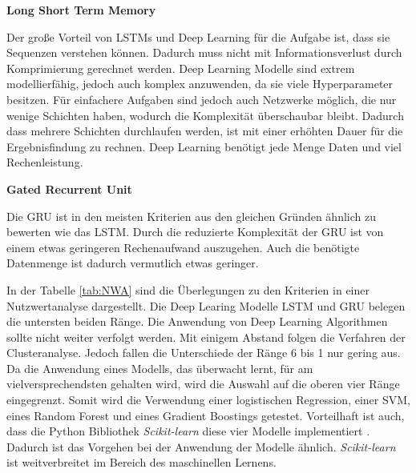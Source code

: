 \clearpage
\textbf{Long Short Term Memory}\par
Der große Vorteil von LSTMs und Deep Learning für die Aufgabe ist, dass sie Sequenzen verstehen können. Dadurch muss nicht mit Informationsverlust durch Komprimierung gerechnet werden. Deep Learning Modelle sind extrem modellierfähig, jedoch auch komplex anzuwenden, da sie viele Hyperparameter besitzen. Für einfachere Aufgaben sind jedoch auch Netzwerke möglich, die nur wenige Schichten haben, wodurch die Komplexität überschaubar bleibt. Dadurch dass mehrere Schichten durchlaufen werden, ist mit einer erhöhten Dauer für die Ergebnisfindung zu rechnen. Deep Learning benötigt jede Menge Daten und viel Rechenleistung. \dubpar

\textbf{Gated Recurrent Unit}\par
Die GRU ist in den meisten Kriterien aus den gleichen Gründen ähnlich zu bewerten wie das LSTM. Durch die reduzierte Komplexität der GRU ist von einem etwas geringeren Rechenaufwand auszugehen. Auch die benötigte Datenmenge ist dadurch vermutlich etwas geringer.\dubpar

In der Tabelle \ref{tab:NWA} sind die Überlegungen zu den Kriterien in einer Nutzwertanalyse dargestellt. Die Deep Learing Modelle LSTM und GRU belegen die untersten beiden Ränge. Die Anwendung von Deep Learning Algorithmen sollte nicht weiter verfolgt werden. Mit einigem Abstand folgen die Verfahren der Clusteranalyse. Jedoch fallen die Unterschiede der Ränge 6 bis 1 nur gering aus. Da die Anwendung eines Modells, das überwacht lernt, für am vielversprechendsten gehalten wird, wird die Auswahl auf die oberen vier Ränge eingegrenzt. Somit wird die Verwendung einer logistischen Regression, einer SVM, eines Random Forest und eines Gradient Boostings getestet. Vorteilhaft ist auch, dass die \gls{Python} \gls{Bibliothek} \textit{Scikit-learn} diese vier Modelle implementiert \cite{FabianPedregosa.2011, Buitinck.2013}. Dadurch ist das Vorgehen bei der Anwendung der Modelle ähnlich. \textit{Scikit-learn} ist weitverbreitet im Bereich des maschinellen Lernens. 

